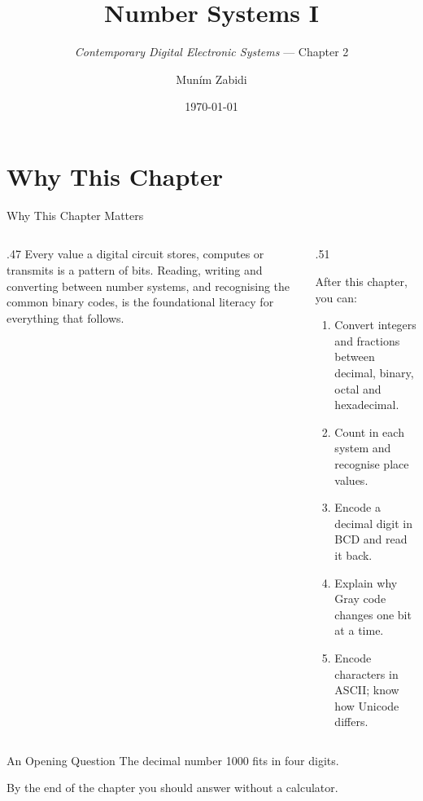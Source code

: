 \documentclass[9pt,aspectratio=169,xcolor=table]{beamer}
\title{Number Systems I}
\subtitle{\emph{Contemporary Digital Electronic Systems} --- Chapter 2}
\author{Mun\'{i}m Zabidi}
\institute{\color{primary}Faculty of Electrical Engineering, Universiti Teknologi Malaysia}
\date{\today}
\begin{document}
\titlepage

\section{Why This Chapter}

\begin{frame}{Why This Chapter Matters}
  \begin{columns}[c]
  \begin{column}{.47\textwidth}
    Every value a digital circuit stores, computes or transmits is a \alert{pattern of bits}. Reading, writing and converting between number systems, and recognising the common binary codes, is the foundational literacy for everything that follows.
  \end{column}
  \begin{column}{.51\textwidth}
    \begin{block}{After this chapter, you can:}
    {\small
    \begin{enumerate}\itemsep2pt
      \item Convert integers and fractions between decimal, binary, octal and hexadecimal.
      \item Count in each system and recognise place values.
      \item Encode a decimal digit in BCD and read it back.
      \item Explain why Gray code changes one bit at a time.
      \item Encode characters in ASCII; know how Unicode differs.
    \end{enumerate}}
    \end{block}
  \end{column}
  \end{columns}
\end{frame}

\begin{frame}{An Opening Question}
  \leavevmode\vspace{4mm}
  The decimal number 1000 fits in four digits.
  \vspace{4mm}
  \begin{center}
  \end{center}
  \vspace{4mm}
  By the end of the chapter you should answer without a calculator.
\end{frame}
\end{document}

